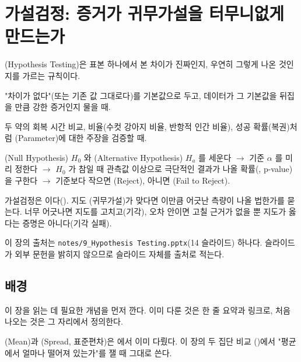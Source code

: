 \chapter{가설검정: 증거가 귀무가설을 터무니없게 만드는가}
\label{ch:hypothesis}

\begin{inbrief}
  \item[Why] (Hypothesis Testing)은 표본 하나에서 본 차이가
             진짜인지, 우연히 그렇게 나온 것인지를 가르는 규칙이다.
  \item[When] "차이가 없다"(또는 기존 값 그대로다)를 기본값으로 두고, 데이터가
              그 기본값을 뒤집을 만큼 강한 증거인지 물을 때.
  \item[Where] 두 약의 회복 시간 비교, 비율(수컷 강아지 비율, 반항적 인간
               비율), 성공 확률(복권)처럼 (Parameter)에 대한
               주장을 검증할 때.
  \item[How] (Null Hypothesis) $H_0$ 와 
             (Alternative Hypothesis) $H_a$ 를 세운다 $\to$ 기준
             $\alpha$ 를 미리 정한다 $\to$ $H_0$ 가 참일 때 관측값 이상으로
             극단적인 결과가 나올 확률(, p-value)을 구한다 $\to$
             기준보다 작으면 (Reject), 아니면
             (Fail to Reject).
\end{inbrief}

\begin{keyidea}
가설검정은 이다(). 지도
(귀무가설)가 맞다면 이만큼 어긋난 측량이 나올 법한가를 묻는다. 너무 어긋나면
지도를 고치고(기각), 오차 안이면 고칠 근거가 없을 뿐 지도가 옳다는 증명은
아니다(기각 실패).
\end{keyidea}

이 장의 출처는 \texttt{notes/9\_Hypothesis Testing.pptx}(14 슬라이드) 하나다.
슬라이드가 외부 문헌을 밝히지 않으므로 슬라이드 자체를 출처로 적는다.

\section{배경}
\label{sec:ht-background}

이 장을 읽는 데 필요한 개념을 먼저 깐다. 이미 다룬 것은 한 줄 요약과 링크로,
처음 나오는 것은 그 자리에서 정의한다.

(Mean)과 (Spread, 표준편차)은
에서 이미 다뤘다. 이 장의 두 집단 비교
()에서 "평균에서 얼마나 떨어져 있는가"를 잴 때 그대로
쓴다.

